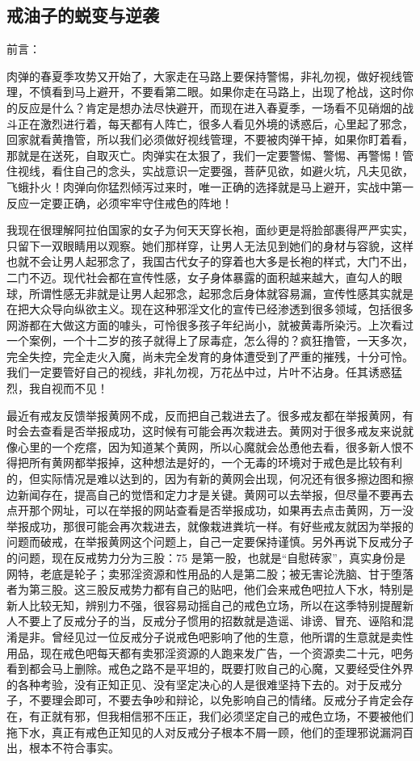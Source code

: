 \subsection{戒油子的蜕变与逆袭}

前言：

肉弹的春夏季攻势又开始了，大家走在马路上要保持警惕，非礼勿视，做好视线管理，不慎看到马上避开，不要看第二眼。如果你走在马路上，出现了枪战，这时你的反应是什么？肯定是想办法尽快避开，而现在进入春夏季，一场看不见硝烟的战斗正在激烈进行着，每天都有人阵亡，很多人看见外境的诱惑后，心里起了邪念，回家就看黄撸管，所以我们必须做好视线管理，不要被肉弹干掉，如果你盯着看，那就是在送死，自取灭亡。肉弹实在太狠了，我们一定要警惕、警惕、再警惕！管住视线，看住自己的念头，实战意识一定要强，菩萨见欲，如避火坑，凡夫见欲，飞蛾扑火！肉弹向你猛烈倾泻过来时，唯一正确的选择就是马上避开，实战中第一反应一定要正确，必须牢牢守住戒色的阵地！

我现在很理解阿拉伯国家的女子为何天天穿长袍，面纱更是将脸部裹得严严实实，只留下一双眼睛用以观察。她们那样穿，让男人无法见到她们的身材与容貌，这样也就不会让男人起邪念了，我国古代女子的穿着也大多是长袍的样式，大门不出，二门不迈。现代社会都在宣传性感，女子身体暴露的面积越来越大，直勾人的眼球，所谓性感无非就是让男人起邪念，起邪念后身体就容易漏，宣传性感其实就是在把大众导向纵欲主义。现在这种邪淫文化的宣传已经渗透到很多领域，包括很多网游都在大做这方面的噱头，可怜很多孩子年纪尚小，就被黄毒所染污。上次看过一个案例，一个十二岁的孩子就得上了尿毒症，怎么得的？疯狂撸管，一天多次，完全失控，完全走火入魔，尚未完全发育的身体遭受到了严重的摧残，十分可怜。我们一定要管好自己的视线，非礼勿视，万花丛中过，片叶不沾身。任其诱惑猛烈，我自视而不见！

最近有戒友反馈举报黄网不成，反而把自己栽进去了。很多戒友都在举报黄网，有时会去查看是否举报成功，这时候有可能会再次栽进去。黄网对于很多戒友来说就像心里的一个疙瘩，因为知道某个黄网，所以心魔就会怂恿他去看，很多新人恨不得把所有黄网都举报掉，这种想法是好的，一个无毒的环境对于戒色是比较有利的，但实际情况是难以达到的，因为有新的黄网会出现，何况还有很多擦边图和擦边新闻存在，提高自己的觉悟和定力才是关键。黄网可以去举报，但尽量不要再去点开那个网址，可以在举报的网站查看是否举报成功，如果再去点击黄网，万一没举报成功，那很可能会再次栽进去，就像栽进粪坑一样。有好些戒友就因为举报的问题而破戒，在举报黄网这个问题上，自己一定要保持谨慎。另外再说下反戒分子的问题，现在反戒势力分为三股：75 是第一股，也就是“自慰砖家”，真实身份是网特，老底是轮子；卖邪淫资源和性用品的人是第二股；被无害论洗脑、甘于堕落者为第三股。这三股反戒势力都有自己的贴吧，他们会来戒色吧拉人下水，特别是新人比较无知，辨别力不强，很容易动摇自己的戒色立场，所以在这季特别提醒新人不要上了反戒分子的当，反戒分子惯用的招数就是造谣、诽谤、冒充、诬陷和混淆是非。曾经见过一位反戒分子说戒色吧影响了他的生意，他所谓的生意就是卖性用品，现在戒色吧每天都有卖邪淫资源的人跑来发广告，一个资源卖二十元，吧务看到都会马上删除。戒色之路不是平坦的，既要打败自己的心魔，又要经受住外界的各种考验，没有正知正见、没有坚定决心的人是很难坚持下去的。对于反戒分子，不要理会即可，不要去争吵和辩论，以免影响自己的情绪。反戒分子肯定会存在，有正就有邪，但我相信邪不压正，我们必须坚定自己的戒色立场，不要被他们拖下水，真正有戒色正知见的人对反戒分子根本不屑一顾，他们的歪理邪说漏洞百出，根本不符合事实。


